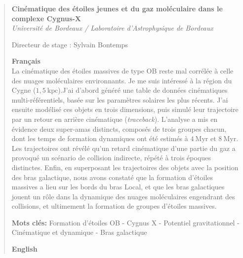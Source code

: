 \documentclass[a4paper, 11pt]{article}
\begin{document}
	\begin{abstract}
		\begin{center}
			\textbf{\Large Cinématique des étoiles jeunes et du gaz moléculaire dans le complexe Cygnus-X} \\
			\vspace{0.2cm}
			\textit{Université de Bordeaux / Laboratoire d'Astrophysique de Bordeaux} \\
			\vspace{0.5cm}
		\end{center}
		
		\noindent Directeur de stage : Sylvain Bontemps
		
		\vspace{1cm}
		
		\textbf{Français} \\
		
		La cinématique des étoiles massives de type OB reste mal corrélée à celle des nuages moléculaires environnants. Je me suis intéressé à la région du Cygne ($1,5 \ \mathrm{kpc}$).J'ai d'abord généré une table de données cinématiques multi-référentiels, basée sur les paramètres solaires les plus récents. J'ai ensuite modélisé ces objets en trois dimensions, puis simulé leur trajectoire par un retour en arrière cinématique (\textit{traceback}). L'analyse a mis en évidence deux super-amas distincts, composés de trois groupes chacun, dont les temps de formation dynamiques ont été estimés à $4 \ \mathrm{Myr}$ et $8 \ \mathrm{Myr}$. Les trajectoires ont révélé qu'un retard cinématique d'une partie du gaz a provoqué un scénario de collision indirecte, répété à trois époques distinctes. Enfin, en superposant les trajectoires des objets avec la position des bras galactique, nous avons constaté que la formation d'étoiles massives a lieu sur les bords du bras Local, et que les bras galactiques jouent un rôle dans la dynamique des nuages moléculaires engendrant des collisions, et ultimement la formation de groupes d'étoiles massives.
		
		\textbf{Mots clés:} Formation d'étoiles OB - Cygnus X - Potentiel gravitationnel - Cinématique et dynamique - Bras galactique
		
		\vspace{1.5cm}
		
		\textbf{English} \\
		

\end{abstract}
\end{document}
